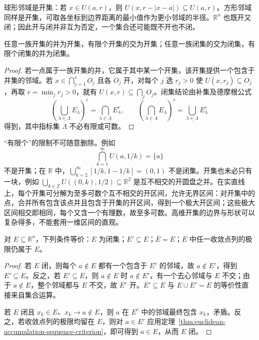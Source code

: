 球形邻域是开集：若 $x\in U(a,r)$，则 $U(x,r-|x-a|)\subseteq U(a,r)$。方形邻域同样是开集，可取各坐标到边界距离的最小值作为更小邻域的半径。$\mathbb R^n$ 也既开又闭；因此开与闭并非互为否定，一个集合还可能既不开也不闭。

\begin{theorem}[开闭集的运算]
\label{thm:euclidean-open-closed-set-operations}
任意一族开集的并为开集，有限个开集的交为开集；任意一族闭集的交为闭集，有限个闭集的并为闭集。
\end{theorem}

\begin{proof}
若一点属于一族开集的并，它属于其中某一个开集，该开集提供一个包含于并集的邻域。若 $x\in\bigcap_{j=1}^s O_j$ 且各 $O_j$ 开，对每个 $j$ 选 $r_j>0$ 使 $U(x,r_j)\subseteq O_j$，再取 $r=\min_jr_j>0$，就有 $U(x,r)\subseteq\bigcap_jO_j$。闭集结论由补集及德摩根公式
\[
    \left(\bigcup_{\lambda\in\Lambda}E_\lambda\right)^c
       =\bigcap_{\lambda\in\Lambda}E_\lambda^c,\qquad
    \left(\bigcap_{\lambda\in\Lambda}E_\lambda\right)^c
       =\bigcup_{\lambda\in\Lambda}E_\lambda^c
\]
得到，其中指标集 $\Lambda$ 不必有限或可数。
\end{proof}

“有限个”的限制不可随意删除。例如
\[
    \bigcap_{k=1}^\infty U(a,1/k)=\{a\}
\]
不是开集；在 $\mathbb R$ 中，$\bigcup_{k=2}^\infty[1/k,1-1/k]=(0,1)$ 不是闭集。开集也未必只有一块，例如 $\bigcup_{k\in\mathbb Z}U((0,k),1/2)\subseteq\mathbb R^2$ 是互不相交的开圆盘之并。在实直线上，每个开集可分解为至多可数个互不相交的开区间，允许无界区间：对开集中的点，合并所有包含该点并且包含于开集的开区间，得到一个极大开区间；这些极大区间相交即相同，每个又含一个有理数，故至多可数。高维开集的边界与形状可以复杂得多，不能套用一维区间的直观。

\begin{theorem}[闭集的聚点与点列刻画]
\label{thm:euclidean-closed-set-criteria}
对 $E\subseteq\mathbb R^n$，下列条件等价：$E$ 为闭集；$E'\subseteq E$；$\overline E=E$；$E$ 中任一收敛点列的极限仍属于 $E$。
\end{theorem}

\begin{proof}
若 $E$ 闭，则每个 $a\notin E$ 都有一个包含于 $E^c$ 的邻域，故 $a\notin E'$，得到 $E'\subseteq E$。反之，若 $E'\subseteq E$，则 $a\notin E$ 时 $a\notin E'$，有一个去心邻域与 $E$ 不交；由于 $a\notin E$，整个邻域都与 $E$ 不交，故 $E^c$ 开。$E'\subseteq E$ 与 $E\cup E'=E$ 的等价性直接来自集合运算。

若 $E$ 闭且 $x_k\in E$、$x_k\to a\notin E$，则 $a$ 在 $E^c$ 中的邻域最终包含 $x_k$，矛盾。反之，若收敛点列的极限均留在 $E$，则对 $a\in E'$ 应用定理~\ref{thm:euclidean-accumulation-sequence-criterion}，即可得到 $a\in E$，从而 $E$ 闭。
\end{proof}

